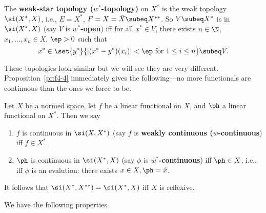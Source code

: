 \begin{df}
The \textbf{weak-star topology ($w^*$-topology)} on $X^*$ is the weak topology $\si(X^*,X)$, i.e., $E=X^*$, $F=X=\hat X\subeq X^{**}$. So $V\subeq X^*$ is in $\si(X^*,X)$ (say $V$ is \textbf{$w^*$-open}) iff for all $x^*\in V$, there exists $n\in \N$, $x_1,\ldots, x_n\in X$, $\ep>0$ such that 
\[
x^*\in\set{y^*}{|(x^*-y^*)(x_i)|<\ep \text{ for }1\le i\le n}\subeq V.
\]
\end{df}
These topologies look similar but we will see they are very different. Proposition~\ref{pr:f4-4} immediately gives the following---no more functionals are continuous than the ones we force to be.
\begin{pr}
Let $X$ be a normed space, let $f$ be a linear functional on $X$, and $\ph$ a linear functional on $X^*$. Then we say
\begin{enumerate}
\item
$f$ is continuous in $\si(X,X^*)$ (say $f$ is \textbf{weakly continuous ($w$-continuous}) iff $f\in X^*$.
\item
$\ph$ is continuous in $\si(X^*,X)$ (say $\phi$ is \textbf{$w^*$-continuous}) iff $\ph\in X$, i.e., 
iff $\phi$ is an evalution: there exists $x\in X, \ph=\hat x$.
\end{enumerate}
It follows that $\si(X^*,X^{**})=\si(X^*,X)$ iff $X$ is reflexive.
\end{pr}
We have the following properties.
